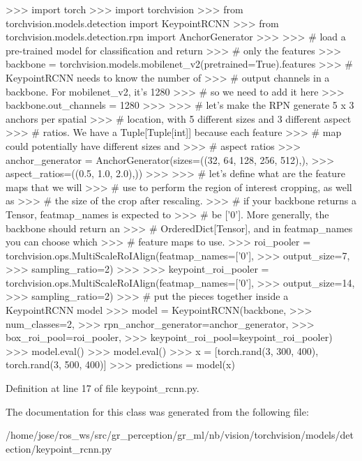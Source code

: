 \begin{DoxyVerb}
    >>> import torch
    >>> import torchvision
    >>> from torchvision.models.detection import KeypointRCNN
    >>> from torchvision.models.detection.rpn import AnchorGenerator
    >>>
    >>> # load a pre-trained model for classification and return
    >>> # only the features
    >>> backbone = torchvision.models.mobilenet_v2(pretrained=True).features
    >>> # KeypointRCNN needs to know the number of
    >>> # output channels in a backbone. For mobilenet_v2, it's 1280
    >>> # so we need to add it here
    >>> backbone.out_channels = 1280
    >>>
    >>> # let's make the RPN generate 5 x 3 anchors per spatial
    >>> # location, with 5 different sizes and 3 different aspect
    >>> # ratios. We have a Tuple[Tuple[int]] because each feature
    >>> # map could potentially have different sizes and
    >>> # aspect ratios
    >>> anchor_generator = AnchorGenerator(sizes=((32, 64, 128, 256, 512),),
    >>>                                    aspect_ratios=((0.5, 1.0, 2.0),))
    >>>
    >>> # let's define what are the feature maps that we will
    >>> # use to perform the region of interest cropping, as well as
    >>> # the size of the crop after rescaling.
    >>> # if your backbone returns a Tensor, featmap_names is expected to
    >>> # be ['0']. More generally, the backbone should return an
    >>> # OrderedDict[Tensor], and in featmap_names you can choose which
    >>> # feature maps to use.
    >>> roi_pooler = torchvision.ops.MultiScaleRoIAlign(featmap_names=['0'],
    >>>                                                 output_size=7,
    >>>                                                 sampling_ratio=2)
    >>>
    >>> keypoint_roi_pooler = torchvision.ops.MultiScaleRoIAlign(featmap_names=['0'],
    >>>                                                          output_size=14,
    >>>                                                          sampling_ratio=2)
    >>> # put the pieces together inside a KeypointRCNN model
    >>> model = KeypointRCNN(backbone,
    >>>                      num_classes=2,
    >>>                      rpn_anchor_generator=anchor_generator,
    >>>                      box_roi_pool=roi_pooler,
    >>>                      keypoint_roi_pool=keypoint_roi_pooler)
    >>> model.eval()
    >>> model.eval()
    >>> x = [torch.rand(3, 300, 400), torch.rand(3, 500, 400)]
    >>> predictions = model(x)
\end{DoxyVerb}
 

Definition at line 17 of file keypoint\+\_\+rcnn.\+py.



The documentation for this class was generated from the following file\+:\begin{DoxyCompactItemize}
\item 
/home/jose/ros\+\_\+ws/src/gr\+\_\+perception/gr\+\_\+ml/nb/vision/torchvision/models/detection/keypoint\+\_\+rcnn.\+py\end{DoxyCompactItemize}
